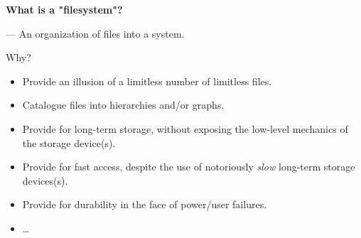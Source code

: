 \begin{frame}

\begin{center}

\Large \textbf{What is a "filesystem"?}

\end{center}

\begin{flushright}

--- An organization of files into a system.

\end{flushright}

Why?

\begin{itemize}

\item Provide an illusion of a limitless number of limitless files.

\item Catalogue files into hierarchies and/or graphs.

\item Provide for long-term storage, without exposing the low-level mechanics
of the storage device(s).

\item Provide for fast access, despite the use of notoriously \emph{slow}
long-term storage devices(s).

\item Provide for durability in the face of power/user failures.

\item \ldots

\end{itemize}

\end{frame}
